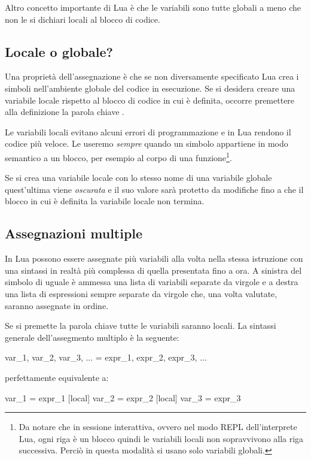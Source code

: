 Altro concetto importante di Lua è che le variabili sono tutte globali a meno
che non le si dichiari locali al blocco di codice.


\subsection{Locale o globale?}
\label{iiSecLocaleGlobale}

Una proprietà dell'assegnazione è che se non diversamente specificato Lua
crea i simboli nell'ambiente globale del codice in esecuzione. Se si
desidera creare una variabile locale rispetto al blocco di codice in cui è
definita, occorre premettere alla definizione la parola chiave .

Le variabili locali evitano alcuni errori di programmazione e in Lua rendono il
codice più veloce. Le useremo \emph{sempre} quando un simbolo appartiene in modo
semantico a un blocco, per esempio al corpo di una funzione\footnote{Da notare
che in sessione interattiva, ovvero nel modo REPL dell'interprete Lua, ogni riga
è un blocco quindi le variabili locali non sopravvivono alla riga successiva.
Perciò in questa modalità si usano solo variabili globali.}.

Se si crea una variabile locale con lo stesso nome di una variabile globale
quest'ultima viene \emph{oscurata} e il suo valore sarà protetto da modifiche
fino a che il blocco in cui è definita la variabile locale non termina.


\subsection{Assegnazioni multiple}

In Lua possono essere assegnate più variabili alla volta nella stessa istruzione
con una sintassi in realtà più complessa di quella presentata fino a ora. A
sinistra del simbolo di uguale è ammessa una lista di variabili separate da
virgole e a destra una lista di espressioni sempre separate da virgole che, una
volta valutate, saranno assegnate in ordine.

Se si premette la parola chiave  tutte le variabili saranno locali.
La sintassi generale dell'assegmento multiplo è la seguente:
\begin{lines}
[local] var_1, var_2, var_3, ... = expr_1, expr_2, expr_3, ...
\end{lines}
perfettamente equivalente a:
\begin{lines}
[local] var_1 = expr_1
[local] var_2 = expr_2
[local] var_3 = expr_3
\end{lines}

